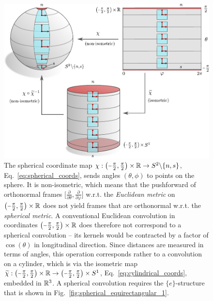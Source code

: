 \begin{figure}
    \centering
    \includegraphics[width=.90\textwidth]{figures/G_structure_spherical_equirectangular_2.pdf}
    \caption{\small
        The spherical coordinate map
        $\chi: \big(\protect\minus\frac{\pi}{2}, \frac{\pi}{2}\big) \times \R \to S^2 \backslash \{n,s\}$, Eq.~\eqref{eq:spherical_coords}, sends angles $(\theta,\phi)$ to points on the sphere.
        It is non-isometric, which means that the pushforward of orthonormal frames
        $\big[ \frac{\partial}{\partial\theta}, \frac{\partial}{\partial\varphi} \big]$
        w.r.t. the \emph{Euclidean metric} on $\big(\protect\minus\frac{\pi}{2}, \frac{\pi}{2}\big) \times \R$ does not yield frames that are orthonormal w.r.t. the \emph{spherical metric}.
        A conventional Euclidean convolution in coordinates $\big(\protect\minus\frac{\pi}{2}, \frac{\pi}{2}\big) \times \R$ does therefore not correspond to a spherical convolution -- its kernels would be contracted by a factor of $\cos(\theta)$ in longitudinal direction.
        Since distances are measured in terms of angles, this operation corresponds rather to a convolution on a cylinder, which is via the isometric map
        $\widetilde{\chi}: \big( {\textstyle \protect\minus\frac{\pi}{2}, \frac{\pi}{2}} \big) \times \R
        \to \big( {\textstyle \protect\minus\frac{\pi}{2}, \frac{\pi}{2}} \big) \times S^1$,
        Eq.~\eqref{eq:cylindrical_coords}, embedded in $\mathbb{R}^3$.
        A spherical convolution requires the $\{e\}$-structure that is shown in Fig.~\ref{fig:spherical_equirectangular_1}.
    }
    \label{fig:spherical_equirectangular_2}
\end{figure}


